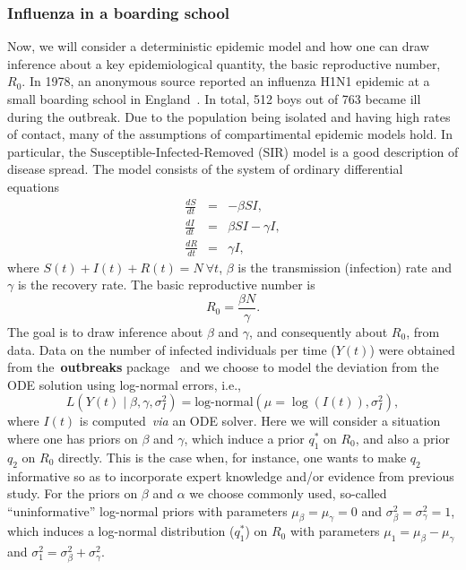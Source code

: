 \documentclass[a4paper, notitlepage, 10pt]{article}
\begin{document}
\subsubsection{Influenza in a boarding school}
\label{sec:SIR_flu}

Now, we will consider a deterministic epidemic model and how one can draw inference about a key epidemiological quantity, the basic reproductive number, $R_0$.
In 1978, an anonymous source reported an influenza H1N1 epidemic at a small boarding school in England~\citep{Anonymous1978}.
In total, 512 boys out of 763 became ill during the outbreak.
Due to the population being isolated and having high rates of contact, many of the assumptions of compartimental epidemic models hold.
In particular, the Susceptible-Infected-Removed (SIR) model is a good description of disease spread.
The model consists of the system of ordinary differential equations
\begin{eqnarray*}
\frac{dS}{dt}&=& - \beta SI,\\
\frac{dI}{dt}&=&  \beta SI - \gamma I,\\
\frac{dR}{dt}&=& \gamma I, 
\end{eqnarray*} 
where  $S(t) + I(t) + R(t) = N \: \forall t$, $\beta$ is the transmission (infection) rate and $\gamma$ is the recovery rate.
The basic reproductive number is 
\begin{equation}
\label{eq:r0def}
R_0 = \frac{\beta N}{\gamma}. 
\end{equation}
The goal is to draw inference about $\beta$ and $\gamma$, and consequently about $R_0$, from data.
Data on the number of infected individuals per time ($Y(t)$) were obtained from the~\textbf{outbreaks} package~\citep{Outbreaks2019} and we choose to model the deviation from the ODE solution using log-normal errors, i.e.,
\begin{equation}
 \label{eq:lognormal_likelihood}
 L(Y(t)\mid \beta, \gamma, \sigma_I^2) = \text{log-normal}(\mu =  \log(I(t)), \sigma_I^2),
\end{equation}
where $I(t)$ is computed~\textit{via} an ODE solver.
Here we will consider a situation where one has priors on $\beta$ and $\gamma$, which induce a prior $q_1^\ast$ on $R_0$, and also a prior $q_2$ on $R_0$ directly.
This is the case when, for instance, one wants to make $q_2$ informative so as to incorporate expert knowledge and/or evidence from previous study.
For the priors on $\beta$ and $\alpha$ we choose commonly used, so-called ``uninformative'' log-normal priors with parameters $\mu_{\beta} = \mu_{\gamma} = 0$ and $\sigma_{\beta}^2 = \sigma_{\gamma}^2 = 1$, which induces a log-normal distribution ($q_1^\ast$) on $R_0$ with parameters $\mu_1 = \mu_\beta - \mu_\gamma$ and $\sigma_1^2 = \sigma_{\beta}^2 +  \sigma_{\gamma}^2$.
\end{document}
